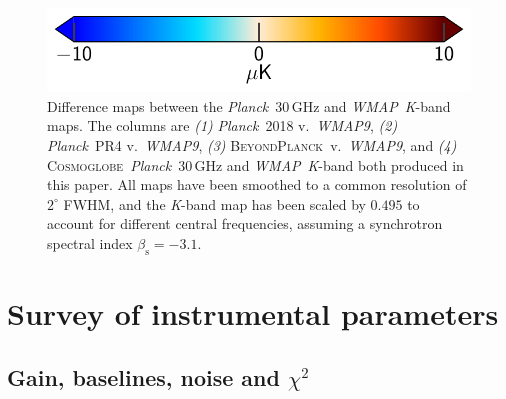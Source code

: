 \documentclass[twocolumn]{../../common/aa}
\def\WMAP{\emph{WMAP}}
\def\WMAPnine{\emph{WMAP9}}
\def\Planck{\emph{Planck}}
\newcommand{\BP}{\textsc{BeyondPlanck}}
\newcommand{\cosmoglobe}{\textsc{Cosmoglobe}}
\newcommand{\K}[0]{\textit K}
\begin{document}
\begin{figure}
        \hspace*{40mm}\includegraphics[width=0.25\textheight]{figures/cbar_10uK.pdf}
	\caption{Difference maps between the \Planck\ 30\,GHz and \WMAP\ \K-band maps. The columns are \textit{(1)} \Planck\ 2018 v.~\WMAPnine, \textit{(2)} \Planck\ PR4 v.~\WMAPnine, \textit{(3)} \BP\ v.~\WMAPnine, and \textit{(4)} \cosmoglobe\ \Planck\ 30\,GHz and \WMAP\ \K-band both produced in this paper. All maps have been smoothed to a common resolution of $2^\circ$ FWHM, and the \K-band map has been scaled by $0.495$ to account for different central frequencies, assuming a synchrotron spectral index $\beta_\mathrm s=-3.1$.}
	\label{fig:diff_history}
\end{figure}
















\appendix

\section{Survey of instrumental parameters}
\label{sec:survey}

\subsection{Gain, baselines, noise and $\chi^2$}

\end{document}
